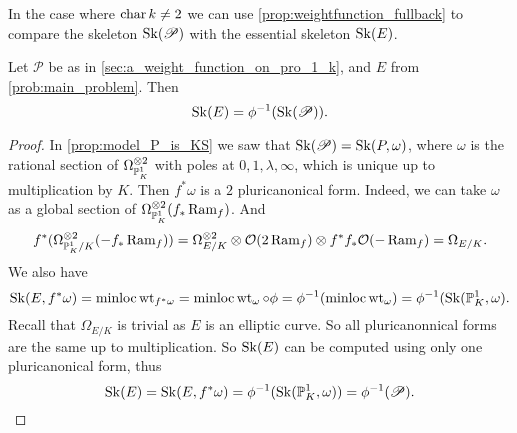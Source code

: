 In the case where $\operatorname{char} k \ne 2$ we can use \cref{prop:weightfunction_fullback} to compare the skeleton $\operatorname{Sk}(\mathscr P)$ with the essential skeleton $\operatorname{Sk}(E)$. 
\begin{lemma}
	Let $\mathscr P$ be as in \cref{sec:a_weight_function_on_pro_1_k}, and $E$ from \cref{prob:main_problem}. 
	Then \[
		\operatorname{Sk}(E) = \phi^{-1}(\operatorname{Sk}(\mathscr P))
	.\] 
\end{lemma}
\begin{proof}
	In \cref{prop:model_P_is_KS} we saw that $\operatorname{Sk}(\mathscr P) = \operatorname{Sk}(P, \omega)$, where $\omega$ is the rational section of $\Omega_{\mathbb{P}^{1}_K}^{\otimes 2}$ with poles at $0, 1, \lambda, \infty$, which is unique up to multiplication by $K$. 
	Then $f^* \omega$ is a $2$ pluricanonical form. 
	Indeed, we can take $\omega$ as a global section of $\Omega_{\mathbb{P}^{1}_K}^{\otimes 2}(f_* \operatorname{Ram} _f)$. 
	And 
	\[
		f^* (\Omega_{\mathbb{P}^{1}_K / K}^{\otimes 2}(-f_* \operatorname{Ram} _f)) = \Omega_{E /K}^{\otimes 2} \otimes \mathcal{O}(2 \operatorname{Ram}_f) \otimes f^*f_* \mathcal{O}(-\operatorname{Ram} _f) = \Omega_{E / K}
	.\] 
	We also have 
	\[
		\operatorname{Sk}(E, f^*\omega) = \operatorname{minloc} \operatorname{wt}_{f^* \omega} = \operatorname{minloc} \operatorname{wt}_{\omega}\circ \phi = \phi^{-1}(\operatorname{minloc} \operatorname{wt}_\omega) = \phi^{-1} (\operatorname{Sk}(\mathbb{P}^{1}_K, \omega)
	.\] 
	Recall that $\Omega_{E / K}$ is trivial as $E$ is an elliptic curve. 
	So all pluricanonnical forms are the same up to multiplication. 
	So $\operatorname{Sk}(E)$ can be computed using only one pluricanonical form, thus \[
		\operatorname{Sk}(E) = \operatorname{Sk}(E, f^*\omega) = \phi^{-1}(\operatorname{Sk}(\mathbb{P}^{1}_K, \omega)) = \phi^{-1}(\mathscr P)
	.\] 
\end{proof}

